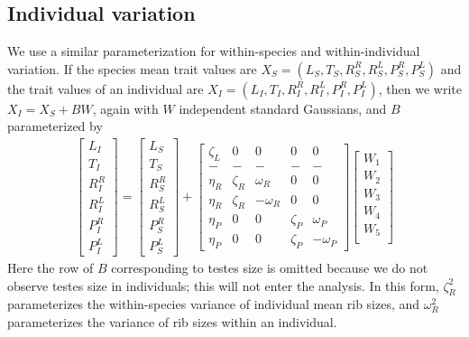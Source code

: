 \documentclass{article}
\begin{document}
%
\subsection{Individual variation}

We use a similar parameterization for within-species and within-individual variation.
If the species mean trait values are $X_S = (L_S,T_S,R^R_S,R^L_S,P^R_S,P^L_S)$ 
and the trait values of an individual are $X_I = (L_I,T_I,R^R_I,R^L_I,P^R_I,P^L_I)$,
then we write $X_I = X_S + B W$, again with $W$ independent standard Gaussians,
and $B$ parameterized by
\begin{align} \label{eqn:sample_matrix}
\begin{bmatrix}
    L_I \\
    T_I \\
    R^R_I \\
    R^L_I \\
    P^R_I \\
    P^L_I
\end{bmatrix}
=
\begin{bmatrix}
    L_S \\
    T_S \\
    R^R_S \\
    R^L_S \\
    P^R_S \\
    P^L_S
\end{bmatrix}
+
\begin{bmatrix}
    \zeta_L  &   0 & 0  & 0  & 0 \\
    - & - & - & - & - \\
    \eta_R  & \zeta_R   &  \omega_R  & 0 & 0 \\ 
    \eta_R  & \zeta_R   & - \omega_R & 0 & 0\\ 
    \eta_P  & 0 & 0 &  \zeta_P  & \omega_P  \\ 
    \eta_P  & 0 & 0 &  \zeta_P  & - \omega_P
\end{bmatrix}
\begin{bmatrix}
W_1 \\W_2 \\W_3 \\W_4 \\ W_5  \\ 
\end{bmatrix}
\end{align}
Here the row of $B$ corresponding to testes size is omitted because we do not observe testes size in individuals;
this will not enter the analysis.
In this form, 
$\zeta_R^2$ parameterizes the within-species variance of individual mean rib sizes,
and $\omega_R^2$ parameterizes the variance of rib sizes within an individual.
\end{document}
